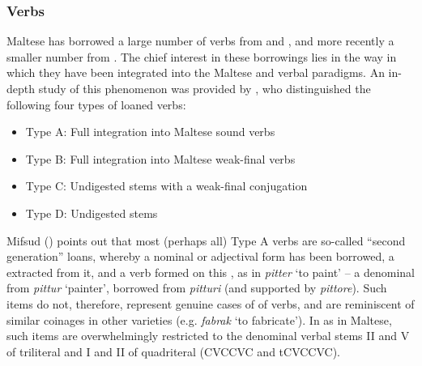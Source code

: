 \documentclass[output=paper]{langsci/langscibook}
\begin{document}
\subsubsection{Verbs}\label{verbmorphology}

\label{loanedverbs}
Maltese has borrowed a large number of verbs from  and , and more recently a smaller number from . The chief interest in these borrowings lies in the way in which they have been integrated into the Maltese  and  verbal paradigms. An in-depth study of this phenomenon was provided by \cite{mifsudloanverbs}, who distinguished the following four types of loaned verbs:

\begin{itemize}[noitemsep]
	\item[] Type A: Full integration into  Maltese sound verbs
    \item[] Type B: Full integration into  Maltese weak-final verbs
    \item[] Type C: Undigested  stems with a weak-final conjugation
    \item[] Type D: Undigested  stems
\end{itemize}


Mifsud (\citeyear[58]{mifsudloanverbs}) points out that most (perhaps all) Type A verbs are so-called ``second generation'' loans, whereby a nominal or adjectival form has been borrowed, a  extracted from it, and a verb formed on this , as in \textit{pitter} `to paint' -- a denominal  from \textit{pittur} `painter', borrowed from  \textit{pitturi} (and supported by  \textit{pittore}). Such items do not, therefore, represent genuine cases of  of verbs, and are reminiscent of similar coinages in other  varieties (e.g. \textit{fabrak} `to fabricate'). In  as in Maltese, such items are overwhelmingly restricted to the denominal verbal stems II and V of triliteral  and I and II of quadriteral  (CVCCVC and tCVCCVC).
\end{document}
